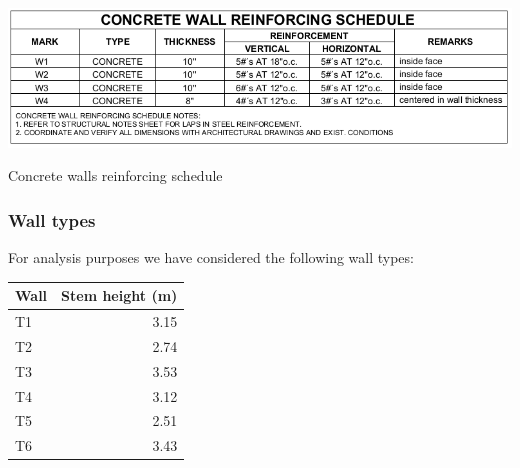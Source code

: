 \begin{table}
    \includegraphics[width=\linewidth]{figures/concrete_wall_reinforcing_schedule.png}
    \caption{Concrete walls reinforcing schedule}\label{tb_concrete_wall_reinforcing_schedule}
\end{table}

\subsubsection{Wall types}
For analysis purposes we have considered the following wall types:

\begin{center}
  \begin{tabular}{|l|r|}
    \hline
    \textbf{Wall} & \textbf{Stem height (m)} \\
    \hline
T1 & 3.15\\
T2 & 2.74\\
T3 & 3.53\\
T4 & 3.12\\
T5 & 2.51\\
T6 & 3.43\\
    \hline
  \end{tabular}
\end{center}


